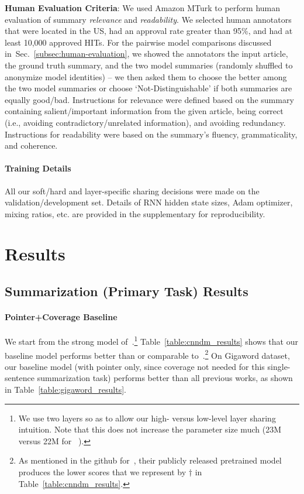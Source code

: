 \documentclass[11pt,a4paper]{article}
\def\secref#1{Sec.~\ref{#1}}
\begin{document}
\noindent\textbf{Human Evaluation Criteria}: We used Amazon MTurk to perform human evaluation of summary \emph{relevance} and \emph{readability}. We selected human annotators that were located in the US, had an approval rate greater than 95\%, and had at least 10,000 approved HITs. For the pairwise model comparisons discussed in~\secref{subsec:human-evaluation}, we showed the annotators the input article, the ground truth summary, and the two model summaries (randomly shuffled to anonymize model identities) -- we then asked them to choose the better among the two model summaries or choose `Not-Distinguishable' if both summaries are equally good/bad.
Instructions for relevance were defined based on the summary containing salient/important information from the given article, being correct (i.e., avoiding contradictory/unrelated information), and avoiding redundancy.
Instructions for readability were based on the summary's fluency, grammaticality, and coherence. 


\paragraph{Training Details}
\label{subsec:training-details}
All our soft/hard and layer-specific sharing decisions were made on the validation/development set. Details of RNN hidden state sizes, Adam optimizer, mixing ratios, etc. are provided in the supplementary for reproducibility.

 
\section{Results}
\label{sec-results}

\subsection{Summarization (Primary Task) Results}

\paragraph{Pointer+Coverage Baseline}
We start from the strong model of~.\footnote{We use two layers so as to allow our high- versus low-level layer sharing intuition. Note that this does not increase the parameter size much (23M versus 22M for ~).} Table~\ref{table:cnndm_results} shows that our baseline model performs better than or comparable to~.\footnote{As mentioned in the github for~, their publicly released pretrained model produces the lower scores that we represent by $\dagger$ in Table~\ref{table:cnndm_results}.} 
On Gigaword dataset, our baseline model (with pointer only, since coverage not needed for this single-sentence summarization task) performs better than all previous works, as shown in Table~\ref{table:gigaword_results}. 
\end{document}
